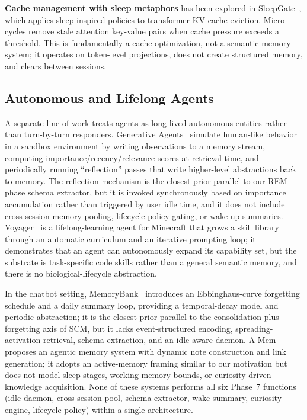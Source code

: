 \documentclass[11pt,twocolumn]{article}
\begin{document}
\textbf{Cache management with sleep metaphors} has been explored in SleepGate~\cite{xie2026sleepgate}, which applies sleep-inspired policies to transformer KV cache eviction. Micro-cycles remove stale attention key-value pairs when cache pressure exceeds a threshold. This is fundamentally a cache optimization, not a semantic memory system; it operates on token-level projections, does not create structured memory, and clears between sessions.

\subsection{Autonomous and Lifelong Agents}

A separate line of work treats agents as long-lived autonomous entities rather than turn-by-turn responders. Generative Agents~\cite{park2023generative} simulate human-like behavior in a sandbox environment by writing observations to a memory stream, computing importance/recency/relevance scores at retrieval time, and periodically running ``reflection'' passes that write higher-level abstractions back to memory. The reflection mechanism is the closest prior parallel to our REM-phase schema extractor, but it is invoked synchronously based on importance accumulation rather than triggered by user idle time, and it does not include cross-session memory pooling, lifecycle policy gating, or wake-up summaries. Voyager~\cite{wang2023voyager} is a lifelong-learning agent for Minecraft that grows a skill library through an automatic curriculum and an iterative prompting loop; it demonstrates that an agent can autonomously expand its capability set, but the substrate is task-specific code skills rather than a general semantic memory, and there is no biological-lifecycle abstraction.

In the chatbot setting, MemoryBank~\cite{zhong2023memorybank} introduces an Ebbinghaus-curve forgetting schedule and a daily summary loop, providing a temporal-decay model and periodic abstraction; it is the closest prior parallel to the consolidation-plus-forgetting axis of SCM, but it lacks event-structured encoding, spreading-activation retrieval, schema extraction, and an idle-aware daemon. A-Mem~\cite{xu2025amem} proposes an agentic memory system with dynamic note construction and link generation; it adopts an active-memory framing similar to our motivation but does not model sleep stages, working-memory bounds, or curiosity-driven knowledge acquisition. None of these systems performs all six Phase~7 functions (idle daemon, cross-session pool, schema extractor, wake summary, curiosity engine, lifecycle policy) within a single architecture.
\end{document}

